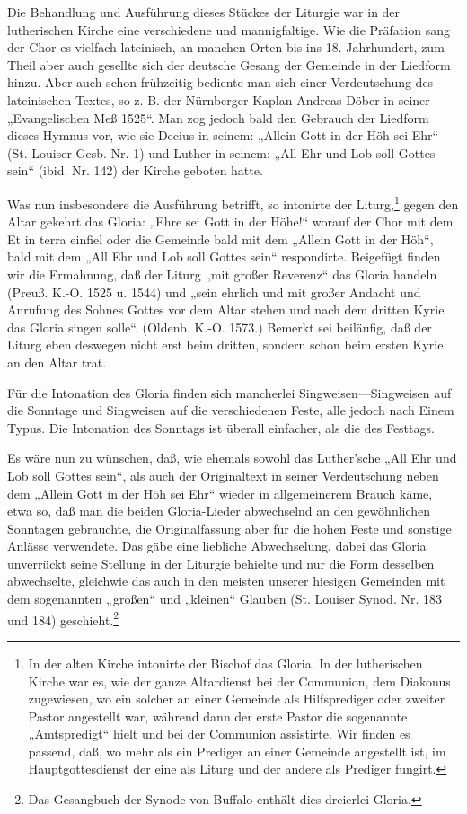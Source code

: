 Die Behandlung und Ausführung dieses Stückes der Liturgie war in der lutherischen Kirche eine verschiedene und mannigfaltige. Wie die Präfation sang der Chor es vielfach lateinisch, an manchen Orten bis ins 18. Jahrhundert, zum Theil aber auch gesellte sich der deutsche Gesang der Gemeinde in der Liedform hinzu. Aber auch schon frühzeitig bediente man sich einer Verdeutschung des lateinischen Textes, so z. B. der Nürnberger Kaplan Andreas Döber in seiner „Evangelischen Meß 1525“. Man zog jedoch bald den Gebrauch der Liedform dieses Hymnus vor, wie sie Decius in seinem: „Allein Gott in der Höh sei Ehr“ (St. Louiser Gesb. Nr. 1) und Luther in seinem: „All Ehr und Lob soll Gottes sein“ (ibid. Nr. 142) der Kirche geboten hatte.

Was nun insbesondere die Ausführung betrifft, so intonirte der Liturg,\footnote{In der alten Kirche intonirte der Bischof das Gloria. In der lutherischen Kirche war es, wie der ganze Altardienst bei der Communion, dem Diakonus zugewiesen, wo ein solcher an einer Gemeinde als Hilfsprediger oder zweiter Pastor angestellt war, während dann der erste Pastor die sogenannte „Amtspredigt“ hielt und bei der Communion assistirte. Wir finden es passend, daß, wo mehr als ein Prediger an einer Gemeinde angestellt ist, im Hauptgottesdienst der eine als Liturg und der andere als Prediger fungirt.} gegen den Altar gekehrt das Gloria: „Ehre sei Gott in der Höhe!“ worauf der Chor mit dem Et in terra einfiel oder die Gemeinde bald mit dem „Allein Gott in der Höh“, bald mit dem „All Ehr und Lob soll Gottes sein“ respondirte. Beigefügt finden wir die Ermahnung, daß der Liturg „mit großer Reverenz“ das Gloria handeln (Preuß. K.-O. 1525 u. 1544) und „sein ehrlich und mit großer Andacht und Anrufung des Sohnes Gottes vor dem Altar stehen und nach dem dritten Kyrie das Gloria singen solle“. (Oldenb. K.-O. 1573.) Bemerkt sei beiläufig, daß der Liturg eben deswegen nicht erst beim dritten, sondern schon beim ersten Kyrie an den Altar trat.

Für die Intonation des Gloria finden sich mancherlei Singweisen—Singweisen auf die Sonntage und Singweisen auf die verschiedenen Feste, alle jedoch nach Einem Typus. Die Intonation des Sonntags ist überall einfacher, als die des Festtags.

Es wäre nun zu wünschen, daß, wie ehemals sowohl das Luther’sche „All Ehr und Lob soll Gottes sein“, als auch der Originaltext in seiner Verdeutschung neben dem „Allein Gott in der Höh sei Ehr“ wieder in allgemeinerem Brauch käme, etwa so, daß man die beiden Gloria-Lieder abwechselnd an den gewöhnlichen Sonntagen gebrauchte, die Originalfassung aber für die hohen Feste und sonstige Anlässe verwendete. Das gäbe eine liebliche Abwechselung, dabei das Gloria unverrückt seine Stellung in der Liturgie behielte und nur die Form desselben abwechselte, gleichwie das auch in den meisten unserer hiesigen Gemeinden mit dem sogenannten „großen“ und „kleinen“ Glauben (St. Louiser Synod. Nr. 183 und 184) geschieht.\footnote{Das Gesangbuch der Synode von Buffalo enthält dies dreierlei Gloria.}

